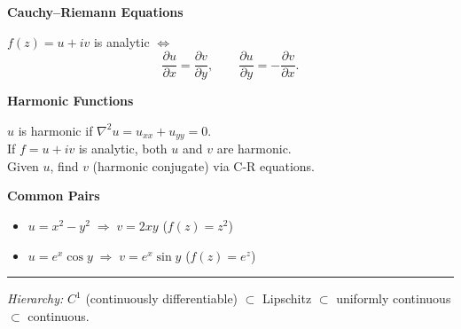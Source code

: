 \documentclass[10pt,twocolumn]{article}
\newcommand{\subsect}[1]{\smallskip\noindent\textbf{#1}\par}
\begin{document}
\subsect{Cauchy--Riemann Equations}
$f(z)=u+iv$ is analytic $\iff$
\[
\frac{\partial u}{\partial x}=\frac{\partial v}{\partial y}, \qquad \frac{\partial u}{\partial y}=-\frac{\partial v}{\partial x}.
\]

\subsect{Harmonic Functions}
$u$ is harmonic if $\nabla^2 u = u_{xx}+u_{yy}=0$.\\
If $f=u+iv$ is analytic, both $u$ and $v$ are harmonic.\\
Given $u$, find $v$ (harmonic conjugate) via C-R equations.

\subsect{Common Pairs}
\begin{itemize}[nosep,leftmargin=*]
\item $u=x^2-y^2 \;\Rightarrow\; v=2xy$ \quad ($f(z)=z^2$)
\item $u=e^x\cos y \;\Rightarrow\; v=e^x\sin y$ \quad ($f(z)=e^z$)
\end{itemize}

\bigskip
\hrule
\smallskip
\begin{center}
\textit{Hierarchy:}\; $C^1$ (continuously differentiable) $\subset$ Lipschitz $\subset$ uniformly continuous $\subset$ continuous.
\end{center}
\end{document}
